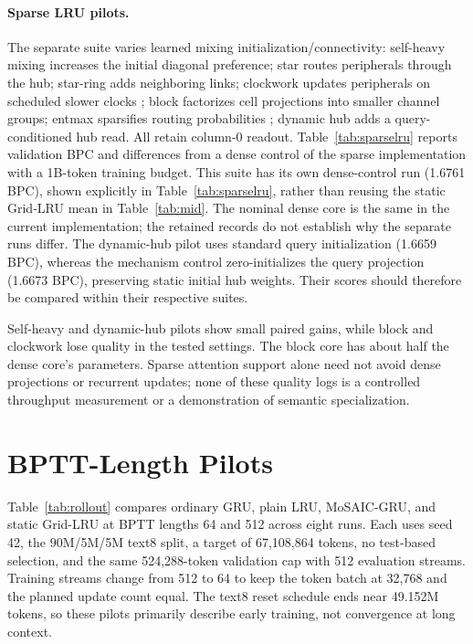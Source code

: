 \documentclass[letterpaper,twoside]{article}
\begin{document}
\paragraph{Sparse LRU pilots.}
The separate suite varies learned mixing initialization/connectivity: self-heavy mixing increases the initial diagonal preference; star routes peripherals through the hub; star-ring adds neighboring links; clockwork updates peripherals on scheduled slower clocks \citep{koutnik2014clockwork}; block factorizes cell projections into smaller channel groups; entmax sparsifies routing probabilities \citep{peters2019entmax}; dynamic hub adds a query-conditioned hub read. All retain column-0 readout. Table~\ref{tab:sparselru} reports validation BPC and differences from a dense control of the sparse implementation with a 1B-token training budget. This suite has its own dense-control run (1.6761 BPC), shown explicitly in Table~\ref{tab:sparselru}, rather than reusing the static Grid-LRU mean in Table~\ref{tab:mid}. The nominal dense core is the same in the current implementation; the retained records do not establish why the separate runs differ. The dynamic-hub pilot uses standard query initialization (1.6659 BPC), whereas the mechanism control zero-initializes the query projection (1.6673 BPC), preserving static initial hub weights. Their scores should therefore be compared within their respective suites.



Self-heavy and dynamic-hub pilots show small paired gains, while block and clockwork lose quality in the tested settings. The block core has about half the dense core's parameters. Sparse attention support alone need not avoid dense projections or recurrent updates; none of these quality logs is a controlled throughput measurement or a demonstration of semantic specialization.

\section{BPTT-Length Pilots}\label{app:rollout}

Table~\ref{tab:rollout} compares ordinary GRU, plain LRU, MoSAIC-GRU, and static Grid-LRU at BPTT lengths 64 and 512 across eight runs. Each uses seed 42, the 90M/5M/5M text8 split, a target of 67,108,864 tokens, no test-based selection, and the same 524,288-token validation cap with 512 evaluation streams. Training streams change from 512 to 64 to keep the token batch at 32,768 and the planned update count equal. The text8 reset schedule ends near 49.152M tokens, so these pilots primarily describe early training, not convergence at long context.
\end{document}

